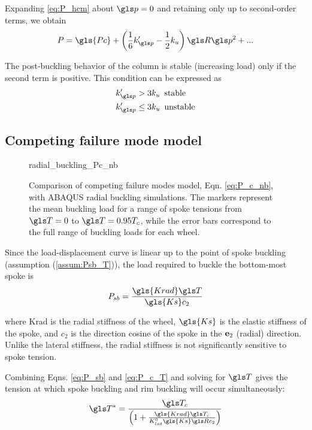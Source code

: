 \documentclass[\rootdir/thesis.tex]{subfiles}
\begin{document}
Expanding \eqref{eq:P_hcm} about $\p=0$ and retaining only up to second-order terms, we obtain
\begin{equation}
\label{eq:P_series_hcm}
P = \gls{Pc} + \left(\frac{1}{6}k'_{\p} - \frac{1}{2}k_u\right)\R\p^2 + ...
\end{equation}

The post-buckling behavior of the column is stable (increasing load) only if the second term is positive. This condition can be expressed as
\begin{align}
\begin{split}
\label{eq:pb_stability_hcm}
k'_{\p} > 3k_u & \,\,\,\text{stable}\\
k'_{\p} \leq 3k_u & \,\,\,\text{unstable}
\end{split}
\end{align}

\subsection{Competing failure mode model}
\label{sec:Pc_nb}

\begin{figure}[t]
\centering
{radial_buckling_Pc_nb}
\caption{Comparison of competing failure modes model, Eqn. \eqref{eq:P_c_nb}, with ABAQUS radial buckling simulations. The markers represent the mean buckling load for a range of spoke tensions from $\T=0$ to $\T=0.95T_c$, while the error bars correspond to the full range of buckling loads for each wheel.}
\label{fig:Pc_rad_theory_comp}
\end{figure}

Since the load-displacement curve is linear up to the point of spoke buckling (assumption (\ref{assum:Psb_T})), the load required to buckle the bottom-most spoke is
\begin{equation}
\label{eq:P_sb}
P_{sb} = \frac{\gls{Krad} \T}{\gls{Ks} c_2}
\end{equation}

where \gls{Krad} is the radial stiffness of the wheel, $\gls{Ks}$ is the elastic stiffness of the spoke, and $c_2$ is the direction cosine of the spoke in the $\mathbf{e}_2$ (radial) direction. Unlike the lateral stiffness, the radial stiffness is not significantly sensitive to spoke tension.

Combining Eqns. \eqref{eq:P_sb} and \eqref{eq:P_c_T} and solving for $\T$ gives the tension at which spoke buckling and rim buckling will occur simultaneously:
\begin{equation}
\label{eq:T_nb}
\T^* = \frac{\T_c}{\left(1 + \frac{\gls{Krad} \T_c}{K_{lat}^0 \gls{Ks} \R c_2}\right)}
\end{equation}
\end{document}
